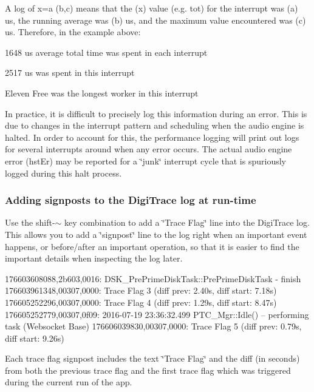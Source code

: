  A log of \textquotesingle{}x=a (b,c)\textquotesingle{} means that the (x) value (e.\+g. {\ttfamily tot}) for the interrupt was (a) us, the running average was (b) us, and the maximum value encountered was (c) us. Therefore, in the example above\+:

 
\begin{DoxyItemize}
\item 1648 us average total time was spent in each interrupt  
\item 2517 us was spent in this interrupt  
\item Eleven Free was the longest worker in this interrupt  
\end{DoxyItemize}

 In practice, it is difficult to precisely log this information during an error. This is due to changes in the interrupt pattern and scheduling when the audio engine is halted. In order to account for this, the performance logging will print out logs for several interrupts around when any error occurs. The actual audio engine error ({\ttfamily hst\+Er}) may be reported for a \char`\"{}junk\char`\"{} interrupt cycle that is spuriously logged during this halt process.

\hypertarget{a00364_digitrace__signposting}{}\subsubsection{Adding signposts to the Digi\+Trace log at run-\/time}\label{a00364_digitrace__signposting}
 Use the shift-\/\textquotesingle{}$\sim$\textquotesingle{} key combination to add a \char`\"{}\+Trace Flag\char`\"{} line into the Digi\+Trace log. This allows you to add a \char`\"{}signpost\char`\"{} line to the log right when an important event happens, or before/after an important operation, so that it is easier to find the important details when inspecting the log later.

\begin{DoxyVerb}176603608088,2b603,0016: DSK_PrePrimeDiskTask::PrePrimeDiskTask - finish
176603961348,00307,0000: Trace Flag 3 (diff prev: 2.40s, diff start: 7.18s)
176605252296,00307,0000: Trace Flag 4 (diff prev: 1.29s, diff start: 8.47s)
176605252779,00307,0f09: 2016-07-19 23:36:32.499 PTC_Mgr::Idle() -- performing task (Websocket Base)
176606039830,00307,0000: Trace Flag 5 (diff prev: 0.79s, diff start: 9.26s)\end{DoxyVerb}


 Each trace flag signpost includes the text \char`\"{}\+Trace Flag\char`\"{} and the diff (in seconds) from both the previous trace flag and the first trace flag which was triggered during the current run of the app.

